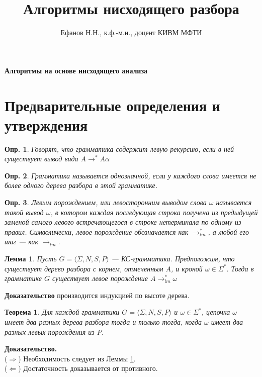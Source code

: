 \documentclass[10pt]{article}         %
\title{Алгоритмы нисходящего разбора}
\author{Ефанов Н.Н., к.ф.-м.н., доцент КИВМ МФТИ}
\newtheorem{definition}{Опр.}
\newtheorem{lemm}{Лемма}
\newtheorem{theorem}{Теорема}
\begin{document}
	
	\maketitle
	
	\textbf{Алгоритмы на основе нисходящего анализа}
	
	\section{Предварительные определения и утверждения}
	\begin{definition}
		Говорят, что грамматика содержит левую рекурсию, если в ней существует вывод вида $A \to^* A\alpha$
	\end{definition}
	\begin{definition}
		Грамматика называется однозначной, если у каждого слова имеется не более одного дерева разбора в этой грамматике.
	\end{definition}
	\begin{definition}
		Левым порождением, или левосторонним выводом слова $\omega$
		называется такой вывод $\omega$, в котором каждая последующая строка получена из предыдущей заменой самого левого встречающегося в строке нетерминала по одному из правил. Символически, левое порождение обозначается как $\to^{*}_{lm}$, а любой его шаг --- как $\to_{lm}$.
	\end{definition}
	
	\begin{lemm}\label{lemm:l1}
	Пусть	$G = \langle \Sigma, N, S, P \rangle$ — КС-грамматика. Предположим, что существует дерево разбора с корнем, отмеченным $A$, и кроной  $\omega \in \Sigma^{*}$. Тогда в грамматике $G$ существует левое порождение $A \to^{*}_{lm} \omega$
	\end{lemm}
	\textbf{Доказательство} производится индукцией по высоте дерева.
	\begin{theorem}
		Для каждой грамматики $G = \langle \Sigma, N, S, P \rangle$ и $\omega \in \Sigma^{*}$, цепочка $\omega$ имеет два разных дерева разбора тогда и только тогда, когда $\omega$ имеет два разных левых порождения из $P$.
	\end{theorem}
	\textbf{Доказательство.}
	\\
	($\Rightarrow$) Необходимость следует из Леммы \ref{lemm:l1}.
	\\
	($\Leftarrow$) Достаточность доказывается от противного.
	
\end{document}

